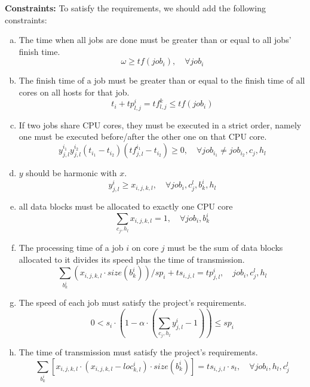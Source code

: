 \documentclass{llncs}
\begin{document}
\textbf{Constraints:} To satisfy the requirements, we should add the following constraints:

\begin{enumerate}[a.)]
    \item The time when all jobs are done must be greater than or equal to all jobs’ finish time.
    \begin{equation}
        \omega \ge tf(job_i), \quad \forall job_i
    \end{equation}
    
    \item The finish time of a job must be greater than or equal to the finish time of all cores on all hosts for that job.
    \begin{equation}
        t_i + tp_{l,j}^i = tf_{l,j}^k \le tf(job_i)
    \end{equation}
    
    \item If two jobs share CPU cores, they must be executed in a strict order, namely one must be executed before/after the other one on that CPU core.
    \begin{equation}
        y_{j,l}^{i_1}y_{j,l}^{i_2}(t_{i_1} - t_{i_2})(tf^{i_1}_{j,l} - t_{i_2}) \ge 0, \quad \forall job_{i_1} \ne job_{i_2}, c_j, h_l
    \end{equation}
    
    \item $y$ should be harmonic with $x$.
    \begin{equation}
        y_{j,l}^i \ge x_{i,j,k,l}, \quad \forall job_i, c_j^l, b^i_k, h_l
    \end{equation}
    
    \item all data blocks must be allocated to exactly one CPU core
    \begin{equation}
        \sum_{c_j, h_l} x_{i,j,k,l} = 1, \quad \forall job_i, b_k^i
    \end{equation}
    
    \item The processing time of a job $i$ on core $j$  must be the sum of data blocks allocated to it divides its speed plus the time of transmission.
    \begin{equation}
        \sum_{b^i_k} (x_{i,j,k,l} \cdot size(b_k^i)) / sp_i + ts_{i,j,l} = tp_{j,l}^i,\quad job_i, c_j^l, h_l
    \end{equation}
    
    \item The speed of each job must satisfy the project’s requirements.
    \begin{equation}
        0 < s_i \cdot (1 - \alpha \cdot (\sum_{c_j, h_l}y_{j,l}^i - 1)) \le sp_i
    \end{equation}
    
    \item The time of transmission must satisfy the project's requirements.
    \begin{equation}
        \sum_{b_k^i} \left[ x_{i,j,k,l} \cdot (x_{i,j,k,l} - loc^i_{k,l}) \cdot size(b_k^i) \right]= ts_{i,j,l} \cdot s_t, \quad \forall job_i, h_l, c_j^l
    \end{equation}
\end{enumerate}
\end{document}
